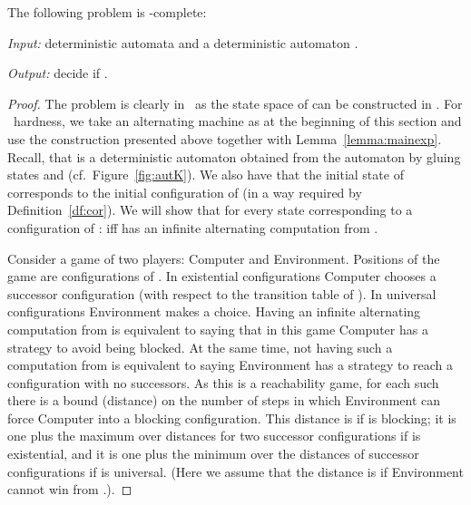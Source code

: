 \documentclass{LMCS}
\theoremstyle{plain}\newtheorem{remark}{Remark}
\theoremstyle{plain}\newtheorem{lemma}[thm]{Lemma}
\begin{document}
\begin{thm} \label{th:main}
  The following problem is \EXPTIME-complete:

\emph{Input:} deterministic automata
  and a deterministic automaton .

\emph{Output:} decide if
.

\end{thm}
\begin{proof}
  The problem is clearly in \EXPTIME\ as the state space of 
  can be constructed in \EXPTIME. For \EXPTIME\ hardness, we take an
  alternating machine  as at the beginning of this section and use
  the construction presented above together with
  Lemma~\ref{lemma:mainexp}. Recall, that  is a deterministic
  automaton obtained from the automaton  by gluing states  and
   (cf.\ Figure~\ref{fig:autK}). We also have that the initial
  state of  corresponds to the initial configuration of  (in
  a way required by Definition~\ref{df:cor}). We will show that for
  every state  corresponding to a configuration  of :  iff  has an infinite alternating computation from .

  Consider a game of two players: Computer and Environment. Positions
  of the game are configurations of . In existential configurations
  Computer chooses a successor configuration (with respect to the
  transition table of ). In universal configurations Environment
  makes a choice. Having an infinite alternating computation from 
  is equivalent to saying that in this game Computer has a strategy to
  avoid being blocked. At the same time, not having such a computation
  from  is equivalent to saying Environment has a strategy to reach
  a configuration with no successors. As this is a reachability game,
  for each such  there is a bound  (distance) on the number of
  steps in which Environment can force Computer into a blocking
  configuration. This distance is  if  is blocking; it is one
  plus the maximum over distances for two successor configurations if
   is existential, and it is one plus the minimum over the
  distances of successor configurations if  is universal. (Here we
  assume that the distance is  if Environment cannot win from
  .).


\end{proof}
\end{document}
